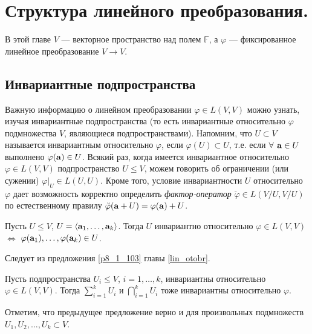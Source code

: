 \chapter{Структура линейного преобразования.}\label{structure}

В этой главе $V$ --- векторное пространство над полем $\mathbb{F}$,
а $\varphi$ --- фиксированное линейное преобразование $V\to V$.


\section{Инвариантные подпространства}

Важную информацию о линейном преобразовании $\varphi \in L(V,V)$ можно узнать, изучая инвариантные
подпространства (то есть инвариантные относительно $\varphi$
подмножества $V$, являющиеся подпространствами). %
Напомним, что $U \subset V$ называется инвариантным относительно $\varphi$, 
если $\varphi (U)\subset U$, т.е. если $\forall$ $\mathbf{a} \in U$
выполнено $\varphi(\mathbf{a}) \in U$.
Всякий раз, когда имеется инвариантное относительно $\varphi \in L(V,V)$ подпространство $U\leq V$,
можем говорить об ограничении (или  сужении) $\varphi | _{U} \in L(U, U)$.
{\footnotesize Кроме того, условие инвариантности $U$ относительно $\varphi$ дает возможность
корректно определить {\it фактор-оператор} $\breve{\varphi} \in L(V/U,V/U)$ по естественному 
правилу  $\breve{\varphi} (\mathbf{a}+U) = \varphi (\mathbf{a}) +U$.}


\begin{predl}\label{p8_5_0}
Пусть  $U\leq V$, $U=\langle \mathbf{a}_1, \ldots, \mathbf{a}_k \rangle$.
Тогда $U$ инвариантно относительно $\varphi \in L(V,V)$ $\Leftrightarrow$ $\varphi (\mathbf{a}_1), \ldots, \varphi (\mathbf{a}_k) \in U$. 
\end{predl}
\dok Следует из предложения \ref{p8_1_103} главы \ref{lin_otobr}.
\edok

\begin{predl}\label{p8_5_1}
Пусть подпространства $U_i\leq V$, $i=1, \ldots, k$, инвариантны относительно
$\varphi \in L(V,V)$. Тогда $\sum\limits_{i=1}^k U_i$ и
$\bigcap\limits_{i=1}^k U_i$ тоже инвариантны относительно
$\varphi$.
\end{predl}
\dok %
\edok

\otstup

Отметим, что предыдущее предложение верно и для произвольных подмножеств
$U_1, U_2, \ldots , U_k \subset V$.

